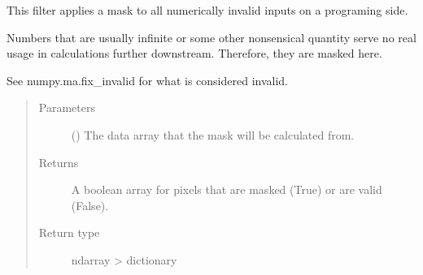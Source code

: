 \documentclass[letterpaper,10pt,english]{sphinxmanual}
\begin{document}
\begin{fulllineitems}
\label{\detokenize{docstrings/ifa_smeargle.masking.filters:ifa_smeargle.masking.filters.filter_invalid_value}}
This filter applies a mask to all numerically invalid inputs
on a programing side.

Numbers that are usually infinite or some other nonsensical
quantity serve no real usage in calculations further downstream.
Therefore, they are masked here.

See numpy.ma.fix\_invalid for what is considered invalid.
\begin{quote}\begin{description}
\item[{Parameters}] \leavevmode
{} () \textendash{} The data array that the mask will be calculated from.

\item[{Returns}] \leavevmode
{} \textendash{} A boolean array for pixels that are masked (True) or are
valid (False).

\item[{Return type}] \leavevmode
ndarray \sphinxhyphen{}\textgreater{} dictionary

\end{description}\end{quote}

\end{fulllineitems}

\end{document}
